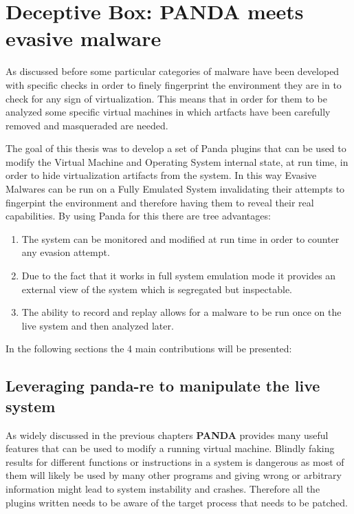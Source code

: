 \chapter{Deceptive Box: PANDA meets evasive malware}
\label{chap:5}

As discussed before some particular categories of malware have been developed with specific checks in order to finely fingerprint the environment they are in to check for any sign of virtualization. This means that in order for them to be analyzed some specific virtual machines in which artfacts have been carefully removed and masqueraded are needed.

The goal of this thesis was to develop a set of Panda plugins that can be used to modify the Virtual Machine and Operating System internal state, at run time, in order to hide virtualization artifacts from the system. In this way Evasive Malwares can be run on a Fully Emulated System invalidating their attempts to fingerpint the environment and therefore having them to reveal their real capabilities.
By using Panda for this there are tree advantages: 
\begin{enumerate}
    \item The system can be monitored and modified at run time in order to counter any evasion attempt. 
    \item Due to the fact that it works in full system emulation mode it provides an external view of the system which is segregated but inspectable.
    \item The ability to record and replay allows for a malware to be run once on the live system and then analyzed later.
\end{enumerate}

In the following sections the 4 main contributions will be presented: 

\section{Leveraging panda-re to manipulate the live system}

As widely discussed in the previous chapters \textbf{PANDA} provides many useful features that can be used to modify a running virtual machine. Blindly faking results for different functions or instructions in a system is dangerous as most of them will likely be used by many other programs and giving wrong or arbitrary information might lead to system instability and crashes. Therefore all the plugins written needs to be aware of the target process that needs to be patched.

